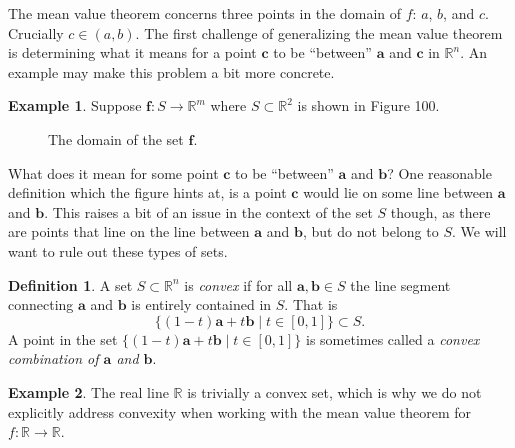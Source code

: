 \documentclass{article}
\newcommand{\R}{\mathbb{R}}
\newcommand{\f}{\mathbf{f}}
\theoremstyle{definition}
\newtheorem{definition}{Definition}[section]
\newtheorem{example}{Example}[section]
\begin{document}
The mean value theorem concerns three points in the domain of $ f $: $ a $, $ b $, and $ c $. Crucially $ c\in(a,b) $. The first challenge of generalizing the mean value theorem is determining what it means for a point $ \mathbf c $ to be ``between'' $ \mathbf a $ and $ \mathbf c $ in $ \R^n $. An example may make this problem a bit more concrete. 
\begin{example}
	Suppose $ \f:S\to\R^m $ where $ S\subset \R^2 $ is shown in Figure 100. 
	\begin{figure}[h!]
		\centering
		\caption{The domain of the set $ \f $.}
	\end{figure}	
What does it mean for some point $ \mathbf c $ to be ``between'' $ \mathbf a $ and $ \mathbf b $? One reasonable definition which the figure hints at, is a point $ \mathbf c $ would lie on some line between $ \mathbf a $ and $ \mathbf b $. This raises a bit of an issue in the context of the set $ S $ though, as there are points that line on the line between $ \mathbf a $ and $ \mathbf b $, but do not belong to $ S $. We will want to rule out these types of sets.
\end{example}
\begin{definition}
	A set $ S\subset \R^n $ is \textit{\color{red}convex} if for all $ \mathbf a,\mathbf b\in S $ the line segment connecting $ \mathbf a $ and $ \mathbf b $ is entirely contained in $ S $. That is 
	$$ \{(1-t)\mathbf a + t\mathbf b\mid t\in [0,1]\}\subset S.$$ A point in the set $\{(1-t)\mathbf a + t\mathbf b\mid t\in [0,1]\}$ is sometimes called a \textit{\color{red} convex combination of $ \mathbf a $ and $ \mathbf b $}. 
\end{definition}
\begin{example}
	The real line $ \R $ is trivially a convex set, which is why we do not explicitly address convexity when working with the mean value theorem for $ f:\R\to\R $.
\end{example}
\end{document}
